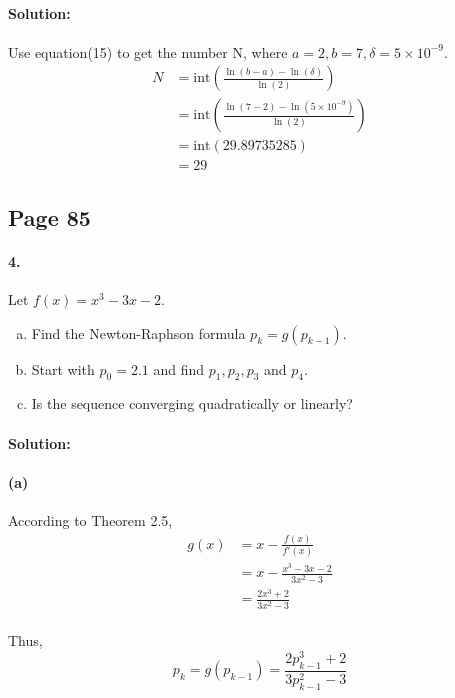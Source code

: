 \documentclass{article}  %
\begin{document}
        \paragraph{Solution:}
        \paragraph{}Use equation(15) to get the number N, where $a = 2, b = 7, \delta = 5 \times 10^{-9}.$
        \begin{align*}
        N &= \mathrm{int}\left(\frac{\ln{(b-a)}-\ln{(\delta)}}{\ln{(2)}}\right) \\
        &= \mathrm{int}\left(\frac{\ln{(7-2)}-\ln{(5 \times 10^{-9})}}{\ln{(2)}}\right) \\
        &= \mathrm{int}\left(29.89735285\right) \\
        &= 29
        \end{align*}
        \subsection*{Page 85}
        \paragraph{4.}Let $f(x) = x^3 - 3x -2$.
        \begin{enumerate}[(a)]
            \item Find the Newton-Raphson formula $p_k = g(p_{k-1})$.
            \item Start with $p_0 = 2.1$ and find $p_1, p_2, p_3$ and $p_4$.
            \item Is the sequence converging quadratically or linearly?
        \end{enumerate}
        \paragraph{Solution:}
        \paragraph{(a)}According to Theorem 2.5,
        \begin{align*}
        g(x) &= x - \frac{f(x)}{f'(x)} \\
        &= x - \frac{x^3 - 3x -2}{3x^2 - 3} \\
        &= \frac{2x^3 + 2}{3x^2 - 3}
        \end{align*}
        \paragraph{}Thus,
        $$p_k = g(p_{k-1}) = \frac{2p_{k-1}^3 + 2}{3p_{k-1}^2 - 3}$$
\end{document}
